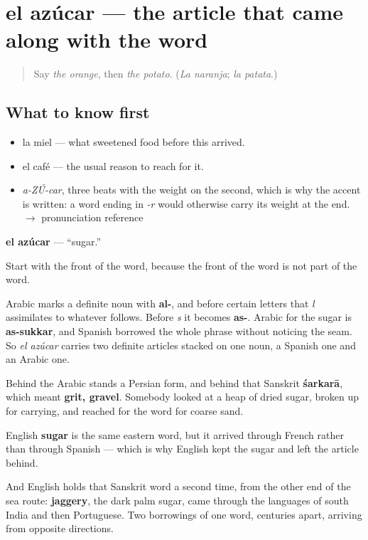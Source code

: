 \section[el azúcar]{el azúcar — the article that came along with the word}

\label{lesson:ES-C367-azucar}



\begin{quote}
Say \emph{the orange}, then \emph{the potato}. (\emph{La naranja}; \emph{la patata}.)
\end{quote}

\subsection*{What to know first}
\begin{itemize}
\raggedright
  \item la miel — what sweetened food before this arrived.
  \item el café — the usual reason to reach for it.
\end{itemize}

\begin{sounds}
\begin{itemize}
\raggedright
  \item \emph{a-ZÚ-car}, three beats with the weight on the second, which is why the accent is written: a word ending in \emph{-r} would otherwise carry its weight at the end. $\to$ pronunciation reference
\end{itemize}
\end{sounds}

\begin{cousinweb}
\textbf{el azúcar} — \textquotedblleft{}sugar.\textquotedblright{}

Start with the front of the word, because the front of the word is not part of the word.

Arabic marks a definite noun with \textbf{al-}, and before certain letters that \emph{l} assimilates to whatever follows. Before \emph{s} it becomes \textbf{as-}. Arabic for the sugar is \textbf{as-sukkar}, and Spanish borrowed the whole phrase without noticing the seam. So \emph{el azúcar} carries two definite articles stacked on one noun, a Spanish one and an Arabic one.

Behind the Arabic stands a Persian form, and behind that Sanskrit \textbf{śarkarā}, which meant \textbf{grit, gravel}. Somebody looked at a heap of dried sugar, broken up for carrying, and reached for the word for coarse sand.

English \textbf{sugar} is the same eastern word, but it arrived through French rather than through Spanish — which is why English kept the sugar and left the article behind.

And English holds that Sanskrit word a second time, from the other end of the sea route: \textbf{jaggery}, the dark palm sugar, came through the languages of south India and then Portuguese. Two borrowings of one word, centuries apart, arriving from opposite directions.
\end{cousinweb}

